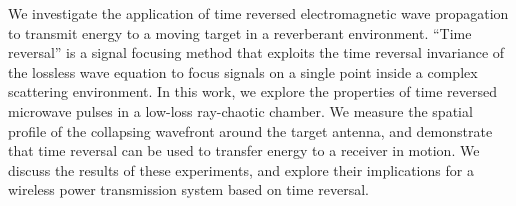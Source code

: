 We investigate the application of time reversed electromagnetic wave propagation
to transmit energy to a moving target in a reverberant environment.
%
``Time reversal'' is a signal focusing method that exploits the time reversal
invariance of the lossless wave equation to focus signals on a single point
inside a complex scattering environment.
%
In this work, we explore the properties of time reversed microwave pulses in a
low-loss ray-chaotic chamber.
%
We measure the spatial profile of the collapsing wavefront around the target
antenna, and demonstrate that time reversal can be used to transfer energy to a
receiver in motion.
%
We discuss the results of these experiments, and explore their implications for
a wireless power transmission system based on time reversal.
